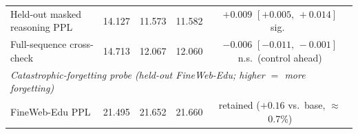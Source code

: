 \begin{table}[t]
\begin{tabular}{lcccc}
Held-out masked reasoning PPL & 14.127 & 11.573 & 11.582 & $+0.009$ $[+0.005,\,+0.014]$ sig.\ \\
Full-sequence cross-check     & 14.713 & 12.067 & 12.060 & $-0.006$ $[-0.011,\,-0.001]$ n.s.\ (control ahead) \\
\midrule
\multicolumn{5}{l}{\emph{Catastrophic-forgetting probe (held-out FineWeb-Edu; higher $=$ more forgetting)}} \\
FineWeb-Edu PPL & 21.495 & 21.652 & 21.660 & retained ($+0.16$ vs.\ base, $\approx$0.7\%) \\
\bottomrule
\end{tabular}
\end{table}
